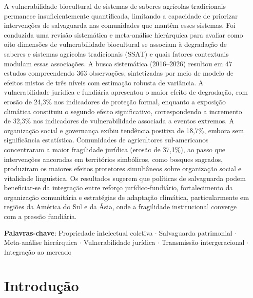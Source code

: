 {\renewcommand{\PRIVATEbookmarkthis}[1]{}%
\begin{resumoumacoluna}
A vulnerabilidade biocultural de sistemas de saberes agrícolas tradicionais permanece insuficientemente quantificada, limitando a capacidade de priorizar intervenções de salvaguarda nas comunidades que mantêm esses sistemas. Foi conduzida uma revisão sistemática e meta-análise hierárquica para avaliar como oito dimensões de vulnerabilidade biocultural se associam à degradação de saberes e sistemas agrícolas tradicionais (SSAT) e quais fatores contextuais modulam essas associações. A busca sistemática (2016--2026) resultou em 47 estudos compreendendo 363 observações, sintetizadas por meio de modelo de efeitos mistos de três níveis com estimação robusta de variância. A vulnerabilidade jurídica e fundiária apresentou o maior efeito de degradação, com erosão de 24,3\% nos indicadores de proteção formal, enquanto a exposição climática constituiu o segundo efeito significativo, correspondendo a incremento de 32,3\% nos indicadores de vulnerabilidade associada a eventos extremos. A organização social e governança exibiu tendência positiva de 18,7\%, embora sem significância estatística. Comunidades de agricultores sul-americanos concentraram a maior fragilidade jurídica (erosão de 37,1\%), ao passo que intervenções ancoradas em territórios simbólicos, como bosques sagrados, produziram os maiores efeitos protetores simultâneos sobre organização social e vitalidade linguística. Os resultados sugerem que políticas de salvaguarda podem beneficiar-se da integração entre reforço jurídico-fundiário, fortalecimento da organização comunitária e estratégias de adaptação climática, particularmente em regiões da América do Sul e da Ásia, onde a fragilidade institucional converge com a pressão fundiária.

\vspace{\onelineskip}
\noindent
\textbf{Palavras-chave}: Propriedade intelectual coletiva $\cdot$ Salvaguarda patrimonial $\cdot$ Meta-análise hierárquica $\cdot$ Vulnerabilidade jurídica $\cdot$ Transmissão intergeracional $\cdot$ Integração ao mercado
\end{resumoumacoluna}}

\newpage

\section{Introdução}
\label{sec:intro_cap2}

